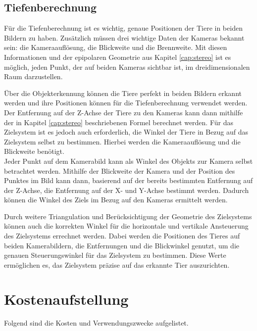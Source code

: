 \subsection{Tiefenberechnung} \label{cap:calc_depth}

Für die Tiefenberechnung ist es wichtig, genaue Positionen der Tiere in beiden Bildern zu haben. Zusätzlich müssen drei wichtige Daten der Kameras bekannt sein: die Kameraauflösung, die Blickweite und die Brennweite. Mit diesen Informationen und der epipolaren Geometrie aus Kapitel \ref{cap:stereo} ist es möglich, jeden Punkt, der auf beiden Kameras sichtbar ist, im dreidimensionalen Raum darzustellen.

Über die Objekterkennung können die Tiere perfekt in beiden Bildern erkannt werden und ihre Positionen können für die Tiefenberechnung verwendet werden. Der Entfernung auf der Z-Achse der Tiere zu den Kameras kann dann mithilfe der in Kapitel \ref{cap:stereo} beschriebenen Formel berechnet werden. Für das Zielsystem ist es jedoch auch erforderlich, die Winkel der Tiere in Bezug auf das Zielsystem selbst zu bestimmen. Hierbei werden die Kameraauflösung und die Blickweite benötigt.
\\
Jeder Punkt auf dem Kamerabild kann als Winkel des Objekts zur Kamera selbst betrachtet werden. Mithilfe der Blickweite der Kamera und der Position des Punktes im Bild kann dann, basierend auf der bereits bestimmten Entfernung auf der Z-Achse, die Entfernung auf der X- und Y-Achse bestimmt werden. Dadurch können die Winkel des Ziels im Bezug auf den Kameras ermittelt werden.

Durch weitere Triangulation und Berücksichtigung der Geometrie des Zielsystems können auch die korrekten Winkel für die horizontale und vertikale Ansteuerung des Zielsystems errechnet werden. Dabei werden die Positionen des Tieres auf beiden Kamerabildern, die Entfernungen und die Blickwinkel genutzt, um die genauen Steuerungswinkel für das Zielsystem zu bestimmen. Diese Werte ermöglichen es, das Zielsystem präzise auf das erkannte Tier auszurichten.

\section{Kostenaufstellung}

Folgend sind die Kosten und Verwendungszwecke aufgelistet. 

